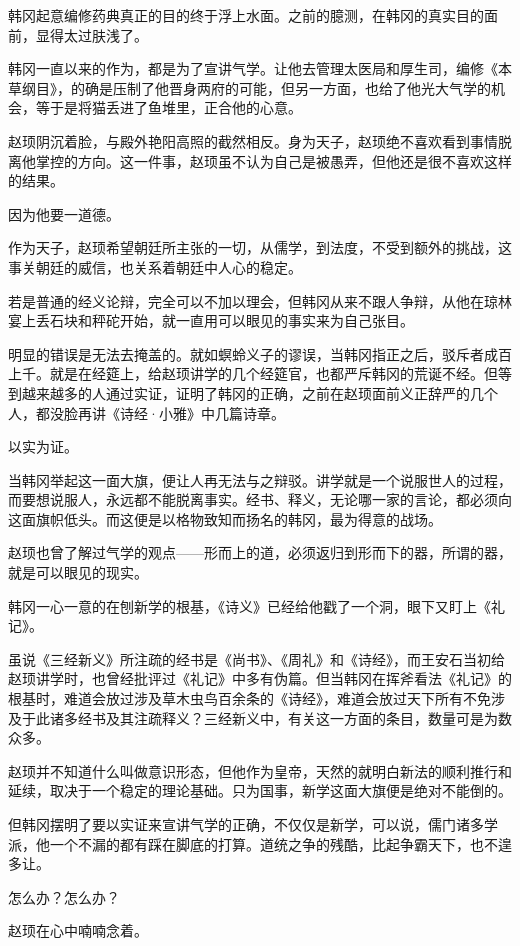 韩冈起意编修药典真正的目的终于浮上水面。之前的臆测，在韩冈的真实目的面前，显得太过肤浅了。

韩冈一直以来的作为，都是为了宣讲气学。让他去管理太医局和厚生司，编修《本草纲目》，的确是压制了他晋身两府的可能，但另一方面，也给了他光大气学的机会，等于是将猫丢进了鱼堆里，正合他的心意。

赵顼阴沉着脸，与殿外艳阳高照的截然相反。身为天子，赵顼绝不喜欢看到事情脱离他掌控的方向。这一件事，赵顼虽不认为自己是被愚弄，但他还是很不喜欢这样的结果。

因为他要一道德。

作为天子，赵顼希望朝廷所主张的一切，从儒学，到法度，不受到额外的挑战，这事关朝廷的威信，也关系着朝廷中人心的稳定。

若是普通的经义论辩，完全可以不加以理会，但韩冈从来不跟人争辩，从他在琼林宴上丢石块和秤砣开始，就一直用可以眼见的事实来为自己张目。

明显的错误是无法去掩盖的。就如螟蛉义子的谬误，当韩冈指正之后，驳斥者成百上千。就是在经筵上，给赵顼讲学的几个经筵官，也都严斥韩冈的荒诞不经。但等到越来越多的人通过实证，证明了韩冈的正确，之前在赵顼面前义正辞严的几个人，都没脸再讲《诗经·小雅》中几篇诗章。

以实为证。

当韩冈举起这一面大旗，便让人再无法与之辩驳。讲学就是一个说服世人的过程，而要想说服人，永远都不能脱离事实。经书、释义，无论哪一家的言论，都必须向这面旗帜低头。而这便是以格物致知而扬名的韩冈，最为得意的战场。

赵顼也曾了解过气学的观点——形而上的道，必须返归到形而下的器，所谓的器，就是可以眼见的现实。

韩冈一心一意的在刨新学的根基，《诗义》已经给他戳了一个洞，眼下又盯上《礼记》。

虽说《三经新义》所注疏的经书是《尚书》、《周礼》和《诗经》，而王安石当初给赵顼讲学时，也曾经批评过《礼记》中多有伪篇。但当韩冈在挥斧看法《礼记》的根基时，难道会放过涉及草木虫鸟百余条的《诗经》，难道会放过天下所有不免涉及于此诸多经书及其注疏释义？三经新义中，有关这一方面的条目，数量可是为数众多。

赵顼并不知道什么叫做意识形态，但他作为皇帝，天然的就明白新法的顺利推行和延续，取决于一个稳定的理论基础。只为国事，新学这面大旗便是绝对不能倒的。

但韩冈摆明了要以实证来宣讲气学的正确，不仅仅是新学，可以说，儒门诸多学派，他一个不漏的都有踩在脚底的打算。道统之争的残酷，比起争霸天下，也不遑多让。

怎么办？怎么办？

赵顼在心中喃喃念着。

